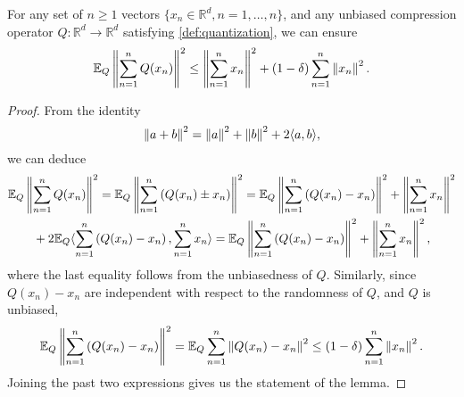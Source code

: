 \begin{lemma}  \label{lemma:sum-unbiasedly-quantized-bound}
    For any set of $n \geq 1$ vectors $\{x_n \in \mathbb{R}^d, n = 1,\ldots,n\}$, and any unbiased compression operator $Q: \mathbb{R}^d \to \mathbb{R}^d$ satisfying \cref{def:quantization}, we can ensure
    \begin{equation*}
        \mathbb{E}_Q \left\lVert\sum_{n = 1}^n Q(x_n)\right\rVert^2 \leq \left\lVert\sum_{n = 1}^n x_n\right\rVert^2 + (1-\delta) \sum_{n = 1}^n \left\lVert x_n\right\rVert^2.
    \end{equation*}
\end{lemma}
\begin{proof}
    From the identity
    \begin{equation*}
        \left\lVert a + b\right\rVert^2 = \left\lVert a\right\rVert^2 +  \left\lVert b\right\rVert^2 + 2\langle a, b \rangle,
    \end{equation*}
    we can deduce
    \begin{multline}
        \mathbb{E}_Q \left\lVert\sum_{n = 1}^n Q(x_n)\right\rVert^2 = \mathbb{E}_Q \left\lVert\sum_{n = 1}^n \left( Q(x_n) \pm x_n\right)\right\rVert^2 = \mathbb{E}_Q \left\lVert\sum_{n = 1}^n \left( Q(x_n) - x_n\right)\right\rVert^2 + \left\lVert\sum_{n = 1}^n x_n\right\rVert^2 \\
        {}+ 2\mathbb{E}_Q \langle \sum_{n = 1}^n \left( Q(x_n) - x_n\right), \sum_{n = 1}^n x_n\rangle =  \mathbb{E}_Q \left\lVert\sum_{n = 1}^n \left (Q(x_n) - x_n\right)\right\rVert^2 + \left\lVert\sum_{n = 1}^n x_n\right\rVert^2,
    \end{multline}
    where the last equality follows from the unbiasedness of $Q$.
    Similarly, since $Q(x_n) - x_n$ are independent with respect to the randomness of $Q$, and $Q$ is unbiased,
    \begin{equation}
        \mathbb{E}_Q \left\lVert\sum_{n = 1}^n \left (Q(x_n) - x_n\right)\right\rVert^2 =  \mathbb{E}_Q \sum_{n = 1}^n \left\lVert Q(x_n) - x_n \right\rVert^2 \leq (1-\delta) \sum_{n = 1}^n \left\lVert x_n\right\rVert^2.
    \end{equation}
    Joining the past two expressions gives us the statement of the lemma.
\end{proof}


